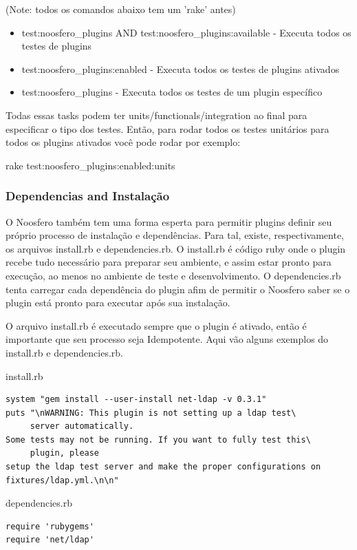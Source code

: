\documentclass[11pt]{article}
\begin{document}
(Note: todos os comandos abaixo tem um 'rake' antes)
\begin{itemize}
  \item test:noosfero\_plugins AND test:noosfero\_plugins:available - 
    Executa todos os testes de plugins
  \item test:noosfero\_plugins:enabled -
    Executa todos os testes de plugins ativados
  \item test:noosfero\_plugins -
    Executa todos os testes de um plugin específico
\end{itemize}

Todas essas tasks podem ter units/functionals/integration ao final para
especificar o tipo dos testes. Então, para rodar todos os testes unitários
para todos os plugins ativados você pode rodar por exemplo:

rake test:noosfero\_plugins:enabled:units

\subsubsection{Dependencias and Instalação}

O Noosfero também tem uma forma esperta para permitir plugins definir seu
próprio processo de instalação e dependências. Para tal, existe,
respectivamente, os arquivos install.rb e dependencies.rb. O install.rb é
código ruby onde o plugin recebe tudo necessário para preparar seu ambiente, e
assim estar pronto para execução, ao menos no ambiente de teste e
desenvolvimento. O dependencies.rb tenta carregar cada dependência do plugin
afim de permitir o Noosfero saber se o plugin está pronto para executar após
sua instalação.

O arquivo install.rb é executado sempre que o plugin é ativado, então é
importante que seu processo seja Idempotente. Aqui vão alguns exemplos do
install.rb e dependencies.rb.

install.rb
\begin{Verbatim}[frame=single,fontfamily=courier]
system "gem install --user-install net-ldap -v 0.3.1"
puts "\nWARNING: This plugin is not setting up a ldap test\
     server automatically.
Some tests may not be running. If you want to fully test this\
     plugin, please
setup the ldap test server and make the proper configurations on
fixtures/ldap.yml.\n\n"
\end{Verbatim}

dependencies.rb
\begin{Verbatim}[frame=single,fontfamily=courier]
require 'rubygems'
require 'net/ldap'
\end{Verbatim}
\end{document}
